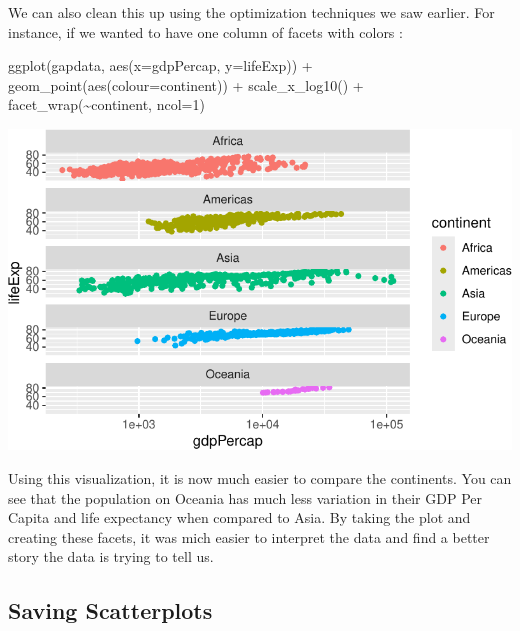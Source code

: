 \documentclass[
  letterpaper,
  DIV=11,
  numbers=noendperiod]{scrreprt}
\newenvironment{Shaded}{\begin{snugshade}}{\end{snugshade}}
\newcommand{\AttributeTok}[1]{\textcolor[rgb]{0.40,0.45,0.13}{#1}}
\newcommand{\DecValTok}[1]{\textcolor[rgb]{0.68,0.00,0.00}{#1}}
\newcommand{\FunctionTok}[1]{\textcolor[rgb]{0.28,0.35,0.67}{#1}}
\newcommand{\NormalTok}[1]{\textcolor[rgb]{0.00,0.23,0.31}{#1}}
\newcommand{\SpecialCharTok}[1]{\textcolor[rgb]{0.37,0.37,0.37}{#1}}
\begin{document}
We can also clean this up using the optimization techniques we saw
earlier. For instance, if we wanted to have one column of facets with
colors :

\begin{Shaded}
\begin{Highlighting}[]
\FunctionTok{ggplot}\NormalTok{(gapdata, }\FunctionTok{aes}\NormalTok{(}\AttributeTok{x=}\NormalTok{gdpPercap, }\AttributeTok{y=}\NormalTok{lifeExp)) }\SpecialCharTok{+}
  \FunctionTok{geom\_point}\NormalTok{(}\FunctionTok{aes}\NormalTok{(}\AttributeTok{colour=}\NormalTok{continent)) }\SpecialCharTok{+}
  \FunctionTok{scale\_x\_log10}\NormalTok{() }\SpecialCharTok{+}
  \FunctionTok{facet\_wrap}\NormalTok{(}\SpecialCharTok{\textasciitilde{}}\NormalTok{continent, }\AttributeTok{ncol=}\DecValTok{1}\NormalTok{) }
\end{Highlighting}
\end{Shaded}

\includegraphics{Advanced_Scatterplot_Techniques_files/figure-pdf/unnamed-chunk-18-1.pdf}

Using this visualization, it is now much easier to compare the
continents. You can see that the population on Oceania has much less
variation in their GDP Per Capita and life expectancy when compared to
Asia. By taking the plot and creating these facets, it was mich easier
to interpret the data and find a better story the data is trying to tell
us.

\subsection*{Saving Scatterplots}\label{saving-scatterplots}
\end{document}
